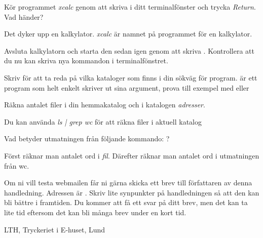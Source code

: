 \documentclass[a4paper,twocolumn]{book}
\begin{document}
\begin{exercise}
  Kör programmet \emph{xcalc} genom att skriva  i
  ditt terminalfönster och trycka \emph{Return}. Vad händer?
  \begin{answer}
    Det dyker upp en kalkylator. \emph{xcalc} är namnet på
    programmet för en kalkylator.
  \end{answer}
\end{exercise}
\begin{exercise}
  Avsluta kalkylatorn och starta den sedan
  igen genom att skriva . Kontrollera att du
  nu kan skriva nya kommandon i terminalfönstret.
\end{exercise}

\begin{exercise}
  Skriv  för att ta reda på vilka kataloger som finns i
  din sökväg för program.  är ett program som helt
  enkelt skriver ut sina argument, prova till exempel med
   eller 
\end{exercise}

\begin{exercise}
  Räkna antalet filer i din hemmakatalog och i katalogen \emph{adresser}.
  \begin{answer}
    Du kan använda \emph{ls | grep wc} för att räkna filer i aktuell katalog
  \end{answer}
\end{exercise}
\begin{exercise}
  Vad betyder utmatningen från följande kommando: 
  \mbox{}?
  \begin{answer}
    Först räknar man antalet ord i \emph{fil}. Därefter räknar man
    antalet ord i utmatningen från wc.
  \end{answer}
\end{exercise}

\begin{exercise}
  Om ni vill testa webmailen får ni gärna skicka ett brev till
  författaren av denna handledning. Adressen är
  . Skriv lite synpunkter på handledningen så att
  den kan bli bättre i framtiden. Du kommer att få ett svar på ditt
  brev, men det kan ta lite tid eftersom det kan bli många brev under
  en kort tid.
\end{exercise}


\appendix
\answers
\label{answers}

\onecolumn
\printindex

\cleardoublepage
\thispagestyle{empty}
\hbox{}
\newpage
\onecolumn
\thispagestyle{empty}
\hbox{}\vfill\noindent\small
\centerline{LTH, Tryckeriet i E-huset, Lund \number\year{}}
\end{document}
